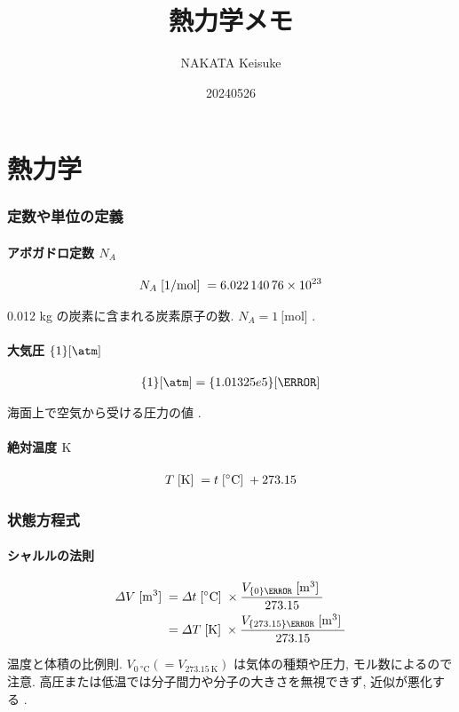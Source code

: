 \documentclass[a4paper,11pt]{jsarticle}
\newcommand{\braunit}[1]{\;\text{[}\unit[per-mode = symbol]{#1}\text{]}\;}
\begin{document}
\title{熱力学メモ}
\author{NAKATA Keisuke}
\date{20240526}
\maketitle


\part*{熱力学}

\section{定数や単位の定義}

\subsection{アボガドロ定数 \texorpdfstring{$N_A$}{N\_A}}
\begin{align*}
  N_A \braunit{\per\mol}= \num{6.02214076e23}
\end{align*}
\par 0.012 kg の炭素に含まれる炭素原子の数. $N_A = \qty{1}{[\mol]}$
\cite[pp.1]{thermo}.

\subsection{大気圧 \texorpdfstring{$\qty{1}{[\atm]}$}{1[atm]}}
\begin{align*}
  \qty{1}{[\atm]} = \qty{1.01325e5}{[\Pa]}
\end{align*}
\par 海面上で空気から受ける圧力の値
\cite[pp.1]{thermo}.

\subsection{絶対温度 \texorpdfstring{$\unit{\K}$}{K}}
\begin{align*}
  T \braunit{\K} = t \braunit{\celsius} + 273.15
\end{align*}
\par \cite[pp.10]{thermo}

\section{状態方程式}

\subsection{シャルルの法則}
\begin{align*}
  \varDelta V\braunit{\m^3}
    &= \varDelta t\braunit{\celsius}\times\frac{V_{\qty{0}{\celsius}}\braunit{\m^3}}{273.15} \\
    &= \varDelta T\braunit{\K}\times\frac{V_{\qty{273.15}{\K}}\braunit{\m^3}}{273.15}
\end{align*}
\par 温度と体積の比例則. $V_{\qty{0}{\celsius}} (=V_{\qty{273.15}{\K}})$ は気体の種類や圧力, モル数によるので注意. 高圧または低温では分子間力や分子の大きさを無視できず, 近似が悪化する
\cite[pp.10]{thermo}.
\end{document}

